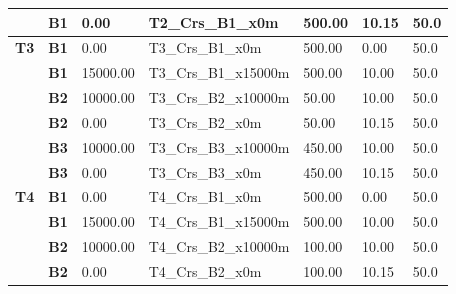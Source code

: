 \begin{longtable}{|p{13.5mm}|p{10.5mm}|p{16.0mm}|p{26.0mm}|p{12.5mm}|p{16.0mm}|p{19.5mm}|}
                                               & \scriptsize\textbf{B1} & \scriptsize{0.00}     & \scriptsize{T2\_Crs\_B1\_x0m}     & \scriptsize{500.00}  & \scriptsize{10.15} & \scriptsize{50.0} \\
\hline
\scriptsize\textcolor[rgb]{1,0,0}{\textbf{T3}} & \scriptsize\textbf{B1} & \scriptsize{0.00}     & \scriptsize{T3\_Crs\_B1\_x0m}     & \scriptsize{500.00}  & \scriptsize{0.00}  & \scriptsize{50.0} \\
                                               & \scriptsize\textbf{B1} & \scriptsize{15000.00} & \scriptsize{T3\_Crs\_B1\_x15000m} & \scriptsize{500.00}  & \scriptsize{10.00} & \scriptsize{50.0} \\
                                               & \scriptsize\textbf{B2} & \scriptsize{10000.00} & \scriptsize{T3\_Crs\_B2\_x10000m} & \scriptsize{50.00}   & \scriptsize{10.00} & \scriptsize{50.0} \\
                                               & \scriptsize\textbf{B2} & \scriptsize{0.00}     & \scriptsize{T3\_Crs\_B2\_x0m}     & \scriptsize{50.00}   & \scriptsize{10.15} & \scriptsize{50.0} \\
                                               & \scriptsize\textbf{B3} & \scriptsize{10000.00} & \scriptsize{T3\_Crs\_B3\_x10000m} & \scriptsize{450.00}  & \scriptsize{10.00} & \scriptsize{50.0} \\
                                               & \scriptsize\textbf{B3} & \scriptsize{0.00}     & \scriptsize{T3\_Crs\_B3\_x0m}     & \scriptsize{450.00}  & \scriptsize{10.15} & \scriptsize{50.0} \\
\hline
\scriptsize\textcolor[rgb]{1,0,0}{\textbf{T4}} & \scriptsize\textbf{B1} & \scriptsize{0.00}     & \scriptsize{T4\_Crs\_B1\_x0m}     & \scriptsize{500.00}  & \scriptsize{0.00}  & \scriptsize{50.0} \\
                                               & \scriptsize\textbf{B1} & \scriptsize{15000.00} & \scriptsize{T4\_Crs\_B1\_x15000m} & \scriptsize{500.00}  & \scriptsize{10.00} & \scriptsize{50.0} \\
                                               & \scriptsize\textbf{B2} & \scriptsize{10000.00} & \scriptsize{T4\_Crs\_B2\_x10000m} & \scriptsize{100.00}  & \scriptsize{10.00} & \scriptsize{50.0} \\
                                               & \scriptsize\textbf{B2} & \scriptsize{0.00}     & \scriptsize{T4\_Crs\_B2\_x0m}     & \scriptsize{100.00}  & \scriptsize{10.15} & \scriptsize{50.0} \\

\end{longtable}
